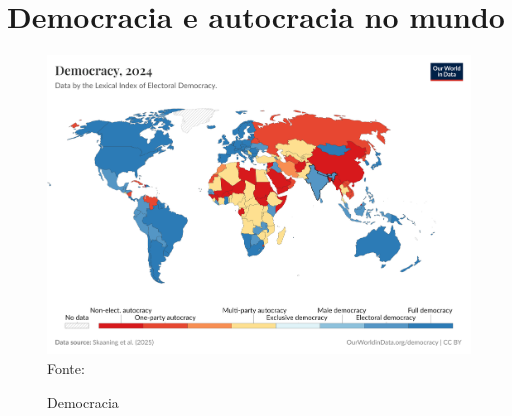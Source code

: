 \chapter{Democracia e autocracia no mundo}
\label{demo_auto_mundo}



\begin{figure}[htbp]
    \centering
    \caption{Democracia}
    \includegraphics[width=1\linewidth]{figuras/democracia/political-regime-lexical.png}
    \label{fig:political-regime-lexical}
    \footnotesize{Fonte: \cite{political_regime_lexical}}
\end{figure}
